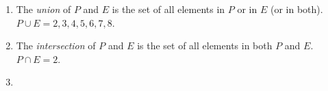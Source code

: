 {\begin{mdframed}[linewidth=4, leftmargin=40, rightmargin=40]
\begin{exercise}
\begin{enumerate}[noitemsep, label=\textbf{Step} \textbf{\arabic*}. ]
\begin{figure}[H]
\begin{center}
      \vspace{2pt}
    \vspace{.1in}
    \end{center}
 \end{figure}       
          \par 
          \item  
          \label{m39377*id110678}The \textsl{union} of
$P$ and \begin{math}E\end{math} is the set of all elements in \begin{math}P\end{math} or in \begin{math}E\end{math} (or in both). \begin{math}P\cup E=2,3,4,5,6,7,8\end{math}. \par 
          \item  
          \label{m39377*id110808}The \textsl{intersection} of $P$ and \begin{math}E\end{math} is the set of all elements in both
$P$ and \begin{math}E\end{math}. \begin{math}P\cap E=2\end{math}.
\par 
          \item  
          \label{m39377*id110962}\nopagebreak\noindent{}
\end{enumerate}
\end{exercise}
\end{mdframed}}
